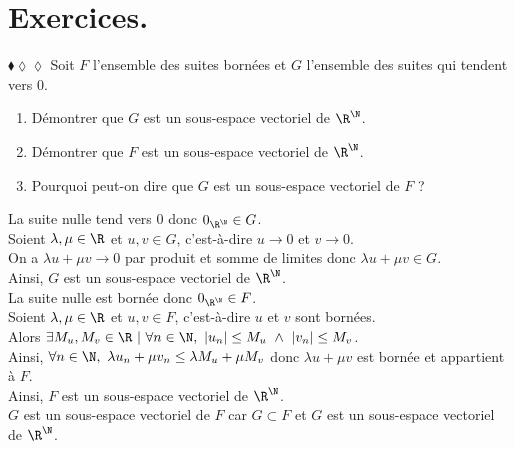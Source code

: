 \documentclass[11pt]{article}
\begin{document}


\thispagestyle{fancy}

\section{Exercices.}

\begin{exercice}{$\blacklozenge\lozenge\lozenge$}{}
    Soit $F$ l'ensemble des suites bornées et $G$ l'ensemble des suites qui tendent vers 0.
    \begin{enumerate}
        \item Démontrer que $G$ est un sous-espace vectoriel de $\R^\N$.
        \item Démontrer que $F$ est un sous-espace vectoriel de $\R^\N$.
        \item Pourquoi peut-on dire que $G$ est un sous-espace vectoriel de $F$ ?
    \end{enumerate}
    \tcblower
     La suite nulle tend vers 0 donc $0_{\R^\N} \in G$.\\
    Soient $\lambda, \mu \in \R$ et $u, v \in G$, c'est-à-dire $u \to 0$ et $v \to 0$.\\
    On a $\lambda u + \mu v \to 0$ par produit et somme de limites donc $\lambda u + \mu v \in G$.\\
    Ainsi, $G$ est un sous-espace vectoriel de $\R^\N$.\\[0.3cm]
      La suite nulle est bornée donc $0_{\R^\N} \in F$.\\
    Soient $\lambda, \mu \in \R$ et $u, v \in F$, c'est-à-dire $u$ et $v$ sont bornées.\\
    Alors $\exists M_u, M_v \in \R ~ | ~ \forall n \in \N, ~ |u_n| \leq M_u ~ \wedge ~  |v_n| \leq M_v$.\\
    Ainsi, $\forall n \in \N, ~ \lambda u_n + \mu v_n \leq \lambda M_u + \mu M_v$ donc $\lambda u + \mu v$ est bornée et appartient à $F$.\\
    Ainsi, $F$ est un sous-espace vectoriel de $\R^\N$.\\[0.3cm]
     $G$ est un sous-espace vectoriel de $F$ car $G \subset F$ et $G$ est un sous-espace vectoriel de $\R^\N$.
\end{exercice}
\end{document}
